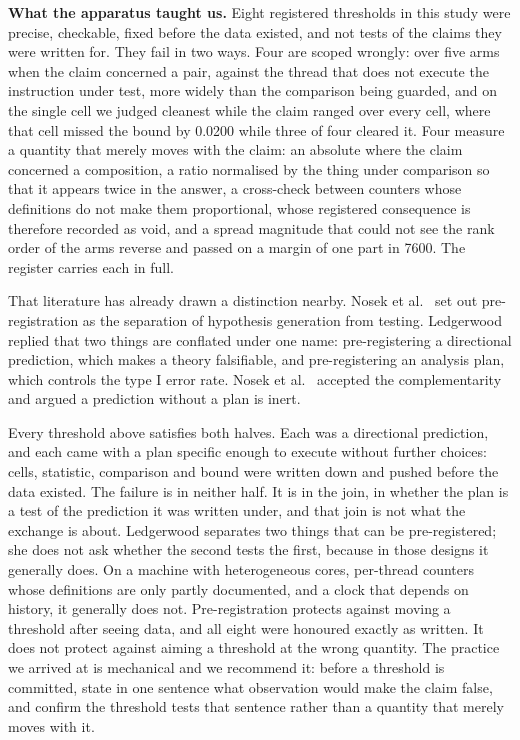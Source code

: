\documentclass[conference]{IEEEtran}
\begin{document}
\textbf{What the apparatus taught us.} Eight registered thresholds in this
study were precise, checkable, fixed before the data existed, and not tests of
the claims they were written for. They fail in two ways. Four are scoped
wrongly: over five arms when the claim concerned a pair, against the thread
that does not execute the instruction under test, more widely than the
comparison being guarded, and on the single cell we judged cleanest while the
claim ranged over every cell, where that cell missed the bound by 0.0200 while
three of four cleared it. Four measure a quantity that merely moves with the
claim: an absolute where the claim concerned a composition, a ratio normalised
by the thing under comparison so that it appears twice in the answer, a
cross-check between counters whose definitions do not make them proportional,
whose registered consequence is therefore recorded as void, and a spread
magnitude that could not see the rank order of the arms reverse and passed on a
margin of one part in 7600. The register carries each in full.

That literature has already drawn a distinction nearby. Nosek et
al.~\cite{nosek2018preregistration} set out pre-registration as the separation
of hypothesis generation from testing.
Ledgerwood~\cite{ledgerwood2018distinguish} replied that two things are
conflated under one name: pre-registering a directional prediction, which makes
a theory falsifiable, and pre-registering an analysis plan, which controls the
type I error rate. Nosek et al.~\cite{nosek2018reply} accepted the
complementarity and argued a prediction without a plan is inert.

Every threshold above satisfies both halves. Each was a directional prediction,
and each came with a plan specific enough to execute without further choices:
cells, statistic, comparison and bound were written down and pushed before the
data existed. The failure is in neither half. It is in the join, in whether the
plan is a test of the prediction it was written under, and that join is not
what the exchange is about. Ledgerwood separates two things that can be
pre-registered; she does not ask whether the second tests the first, because in
those designs it generally does. On a machine with heterogeneous cores,
per-thread counters whose definitions are only partly documented, and a clock
that depends on history, it generally does not. Pre-registration protects
against moving a threshold after seeing data, and all eight were honoured
exactly as written. It does not protect against aiming a threshold at the wrong
quantity. The practice we arrived at is mechanical and we recommend it: before
a threshold is committed, state in one sentence what observation would make the
claim false, and confirm the threshold tests that sentence rather than a
quantity that merely moves with it.
\end{document}
